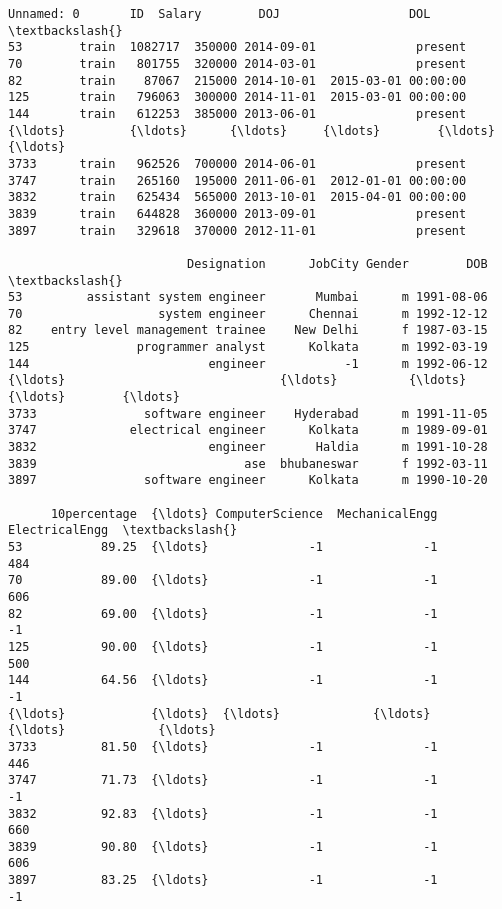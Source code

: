 \documentclass[11pt]{article}
\makeatletter
\newcommand{\boxspacing}{\kern\kvtcb@left@rule\kern\kvtcb@boxsep}
\newcommand{\prompt}[4]{
        \ttfamily\llap{{\color{#2}[#3]:\hspace{3pt}#4}}\vspace{-\baselineskip}
    }
\makeatother
\begin{document}
            \begin{tcolorbox}[breakable, size=fbox, boxrule=.5pt, pad at break*=1mm, opacityfill=0]
\prompt{Out}{outcolor}{42}{\boxspacing}
\begin{Verbatim}[commandchars=\\\{\}]
     Unnamed: 0       ID  Salary        DOJ                  DOL  \textbackslash{}
53        train  1082717  350000 2014-09-01              present
70        train   801755  320000 2014-03-01              present
82        train    87067  215000 2014-10-01  2015-03-01 00:00:00
125       train   796063  300000 2014-11-01  2015-03-01 00:00:00
144       train   612253  385000 2013-06-01              present
{\ldots}         {\ldots}      {\ldots}     {\ldots}        {\ldots}                  {\ldots}
3733      train   962526  700000 2014-06-01              present
3747      train   265160  195000 2011-06-01  2012-01-01 00:00:00
3832      train   625434  565000 2013-10-01  2015-04-01 00:00:00
3839      train   644828  360000 2013-09-01              present
3897      train   329618  370000 2012-11-01              present

                         Designation      JobCity Gender        DOB  \textbackslash{}
53         assistant system engineer       Mumbai      m 1991-08-06
70                   system engineer      Chennai      m 1992-12-12
82    entry level management trainee    New Delhi      f 1987-03-15
125               programmer analyst      Kolkata      m 1992-03-19
144                         engineer           -1      m 1992-06-12
{\ldots}                              {\ldots}          {\ldots}    {\ldots}        {\ldots}
3733               software engineer    Hyderabad      m 1991-11-05
3747             electrical engineer      Kolkata      m 1989-09-01
3832                        engineer       Haldia      m 1991-10-28
3839                             ase  bhubaneswar      f 1992-03-11
3897               software engineer      Kolkata      m 1990-10-20

      10percentage  {\ldots} ComputerScience  MechanicalEngg  ElectricalEngg  \textbackslash{}
53           89.25  {\ldots}              -1              -1             484
70           89.00  {\ldots}              -1              -1             606
82           69.00  {\ldots}              -1              -1              -1
125          90.00  {\ldots}              -1              -1             500
144          64.56  {\ldots}              -1              -1              -1
{\ldots}            {\ldots}  {\ldots}             {\ldots}             {\ldots}             {\ldots}
3733         81.50  {\ldots}              -1              -1             446
3747         71.73  {\ldots}              -1              -1              -1
3832         92.83  {\ldots}              -1              -1             660
3839         90.80  {\ldots}              -1              -1             606
3897         83.25  {\ldots}              -1              -1              -1


\end{Verbatim}
\end{tcolorbox}
\end{document}
